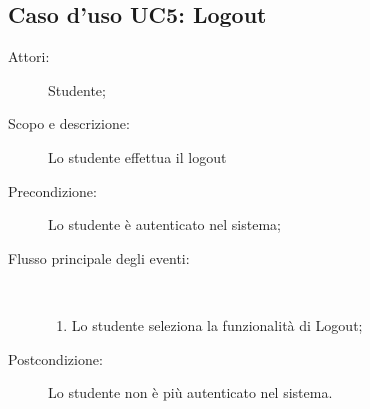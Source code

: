 \subsection{Caso d'uso UC5: Logout}\begin{description}
	\item[Attori:] Studente;
	\item[Scopo e descrizione:] Lo studente effettua il logout
	\item[Precondizione:] Lo studente è autenticato nel sistema;
	
	\item[Flusso principale degli eventi:] \ 
	\begin{enumerate}
		\item Lo studente seleziona la funzionalità di Logout;
		
	\end{enumerate}
	\item[Postcondizione:] Lo studente non è più autenticato nel sistema.
\end{description}
\hypertarget{UC6}{}
